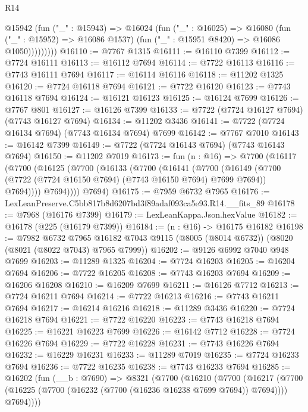\begin{lexlean}{R14}
\begin{coremodule}
              @15942
                (fun ("_" : @15943) =>
                @16024
                  (fun ("_" : @16025) =>
                  @16080
                    (fun ("_" : @15952) => @16086 @1537)
                    (fun ("_" : @15951 @8420) => @16086 @1050)))))))))
@16110 := @7767 @1315
@16111 := @16110 @7399
@16112 := @7724 @16111
@16113 := @16112 @7694
@16114 := @7722 @16113
@16116 := @7743 @16111 @7694
@16117 := @16114 @16116
@16118 := @11202 @1325
@16120 := @7724 @16118 @7694
@16121 := @7722 @16120
@16123 := @7743 @16118 @7694
@16124 := @16121 @16123
@16125 := @16124 @7699
@16126 := @7767 @801
@16127 := @16126 @7399
@16133 := @7722 (@7724 @16127 @7694) (@7743 @16127 @7694)
@16134 := @11202 @3436
@16141 := @7722 (@7724 @16134 @7694) (@7743 @16134 @7694) @7699
@16142 := @7767 @7010
@16143 := @16142 @7399
@16149 := @7722 (@7724 @16143 @7694) (@7743 @16143 @7694)
@16150 := @11202 @7019
@16173 := fun (n : @16) =>
  @7700
    (@16117
      (@7700
        (@16125
          (@7700
            (@16133
              (@7700
                (@16141
                  (@7700
                    (@16149
                      (@7700 (@7722 (@7724 @16150 @7694) (@7743 @16150 @7694) @7699 @7694))
                      @7694))))
              @7694))))
      @7694)
@16175 := @7959 @6732 @7965
@16176 := LexLeanPreserve.C5bb817b8d6207bd3f89adaf093ca5e93.R14.__fits_89
@16178 := @7968 (@16176 @7399)
@16179 := LexLeanKappa.Json.hexValue
@16182 := @16178 (@225 (@16179 @7399))
@16184 := (n : @16) -> @16175 @16182
@16198 := @7982
    @6732
    @7965
    @16182
    @7043
    @9115
    (@8005 (@8014 @6732))
    (@8020 (@8021 (@8022 @7043) @7965 @7999))
@16202 := @9126 @6992 @7040 @948 @7699
@16203 := @11289 @1325
@16204 := @7724 @16203
@16205 := @16204 @7694
@16206 := @7722 @16205
@16208 := @7743 @16203 @7694
@16209 := @16206 @16208
@16210 := @16209 @7699
@16211 := @16126 @7712
@16213 := @7724 @16211 @7694
@16214 := @7722 @16213
@16216 := @7743 @16211 @7694
@16217 := @16214 @16216
@16218 := @11289 @3436
@16220 := @7724 @16218 @7694
@16221 := @7722 @16220
@16223 := @7743 @16218 @7694
@16225 := @16221 @16223 @7699
@16226 := @16142 @7712
@16228 := @7724 @16226 @7694
@16229 := @7722 @16228
@16231 := @7743 @16226 @7694
@16232 := @16229 @16231
@16233 := @11289 @7019
@16235 := @7724 @16233 @7694
@16236 := @7722 @16235
@16238 := @7743 @16233 @7694
@16285 := @16202
    (fun (__b : @7690) =>
    @8321
      (@7700
        (@16210
          (@7700
            (@16217
              (@7700 (@16225 (@7700 (@16232 (@7700 (@16236 @16238 @7699 @7694)) @7694))))
              @7694))))

\end{coremodule}
\end{lexlean}
